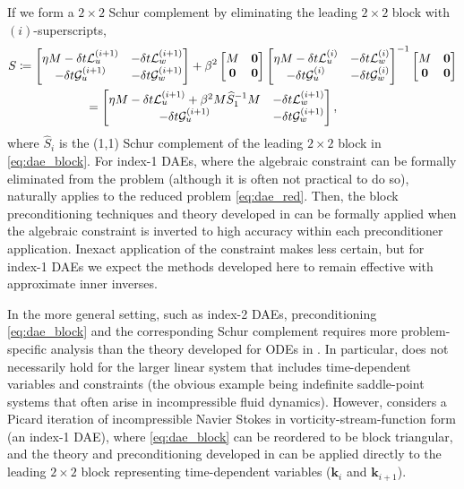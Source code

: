 \documentclass[review]{siamart}
\begin{document}
%
If we form a $2\times 2$ Schur complement by eliminating the leading
$2\times 2$ block with $(i)$-superscripts,
%
\begin{align}\nonumber
S \coloneqq \begin{bmatrix} \eta M - \delta t\mathcal{L}_{u}^{(i+1)} &
	-\delta t\mathcal{L}_{w}^{(i+1)} \\ -\delta t\mathcal{G}_{u}^{(i+1)} &
		-\delta t\mathcal{G}_w^{(i+1)} \end{bmatrix}&
	+ \beta^2 \begin{bmatrix} M & \mathbf{0} \\\mathbf{0} & \mathbf{0} \end{bmatrix}
	\begin{bmatrix} \eta M - \delta t\mathcal{L}_{u}^{(i)} &
	-\delta t\mathcal{L}_{w}^{(i)} \\ -\delta t\mathcal{G}_{u}^{(i)} &
		-\delta t\mathcal{G}_w^{(i)} \end{bmatrix}^{-1}
	\begin{bmatrix} M & \mathbf{0} \\\mathbf{0} & \mathbf{0} \end{bmatrix} \\
&\hspace{-20ex}
= \begin{bmatrix} \eta M - \delta t\mathcal{L}_{u}^{(i+1)} + \beta^2M \widehat{S}_1^{-1}M &
	-\delta t\mathcal{L}_{w}^{(i+1)} \\ -\delta t\mathcal{G}_{u}^{(i+1)} &
		-\delta t\mathcal{G}_w^{(i+1)} \end{bmatrix},\label{eq:dae_red}
\end{align}
%
where $\widehat{S}_i$ is the (1,1) Schur complement of the leading $2\times2$
block in \eqref{eq:dae_block}.
For index-1 DAEs, where the algebraic constraint can be formally eliminated from
the problem (although it is often not practical to do so), 
naturally applies to the reduced problem \eqref{eq:dae_red}. Then, the block preconditioning
techniques and theory developed in  can be formally applied
when the algebraic constraint is inverted to high accuracy within each
preconditioner application. Inexact application of the constraint makes
 less certain, but for index-1 DAEs we expect the methods
developed here to remain effective with approximate inner inverses.

In the more general setting, such as index-2 DAEs, preconditioning
\eqref{eq:dae_block} and the corresponding Schur complement requires more
problem-specific analysis than the theory developed for ODEs in
. In particular,  does not necessarily hold for
the larger linear system that includes time-dependent variables and constraints
(the obvious example being indefinite saddle-point systems that often arise in
incompressible fluid dynamics). However,  considers a
Picard iteration of incompressible Navier Stokes in vorticity-stream-function
form (an index-1 DAE), where \eqref{eq:dae_block} can be reordered to be block
triangular, and the theory and preconditioning developed in 
can be applied directly to the leading $2\times 2$ block representing
time-dependent variables ($\mathbf{k}_i$ and $\mathbf{k}_{i+1}$).
\end{document}
